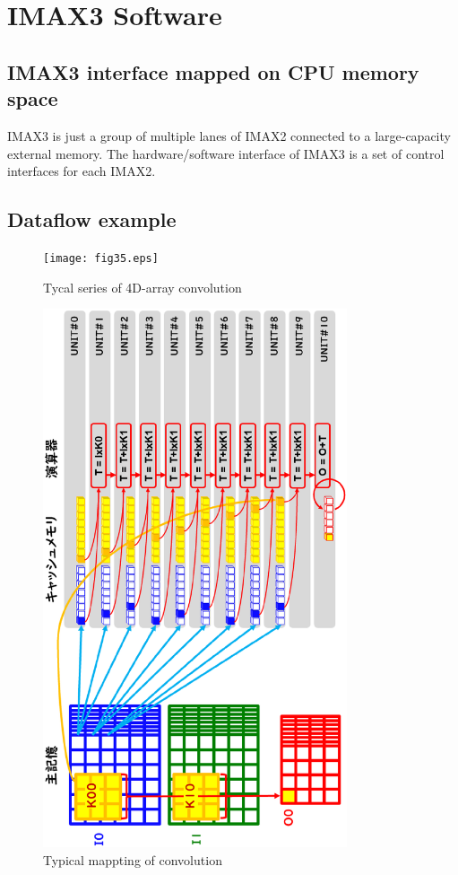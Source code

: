 
\chapter{IMAX3 Software}

\section{IMAX3 interface mapped on CPU memory space}

IMAX3 is just a group of multiple lanes of IMAX2 connected to a
large-capacity external memory. The hardware/software interface of IMAX3 is
a set of control interfaces for each IMAX2.

\section{Dataflow example}

\begin{figure}[htbp]
\center
\texttt{[image: fig35.eps]}
\caption{\label{fig:4dconv}Tycal series of 4D-array convolution}
\end{figure}

\begin{figure}[htbp]
\center
\includegraphics[angle=270,origin=b,width=0.80\textwidth]{fig36.eps}
\caption{\label{fig:4dmap}Typical mappting of convolution}
\end{figure}

